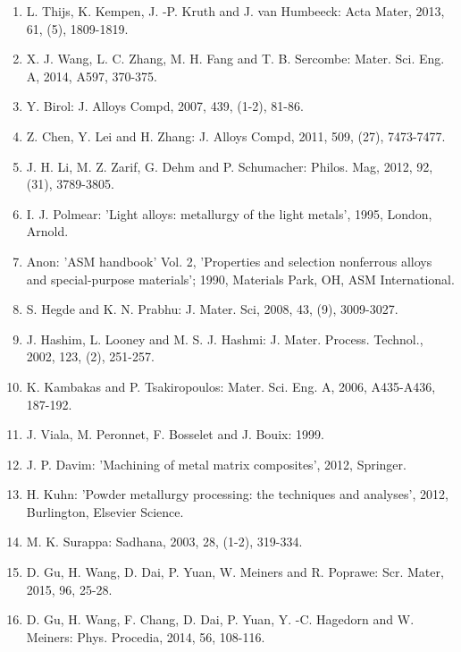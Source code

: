 \documentclass[10pt]{article}
\begin{document}
\begin{enumerate}
  \item L. Thijs, K. Kempen, J. -P. Kruth and J. van Humbeeck: Acta Mater, 2013, 61, (5), 1809-1819.

  \item X. J. Wang, L. C. Zhang, M. H. Fang and T. B. Sercombe: Mater. Sci. Eng. A, 2014, A597, 370-375.

  \item Y. Birol: J. Alloys Compd, 2007, 439, (1-2), 81-86.

  \item Z. Chen, Y. Lei and H. Zhang: J. Alloys Compd, 2011, 509, (27), 7473-7477.

  \item J. H. Li, M. Z. Zarif, G. Dehm and P. Schumacher: Philos. Mag, 2012, 92, (31), 3789-3805.

  \item I. J. Polmear: 'Light alloys: metallurgy of the light metals', 1995, London, Arnold.

  \item Anon: 'ASM handbook' Vol. 2, 'Properties and selection nonferrous alloys and special-purpose materials'; 1990, Materials Park, OH, ASM International.

  \item S. Hegde and K. N. Prabhu: J. Mater. Sci, 2008, 43, (9), 3009-3027.

  \item J. Hashim, L. Looney and M. S. J. Hashmi: J. Mater. Process. Technol., 2002, 123, (2), 251-257.

  \item K. Kambakas and P. Tsakiropoulos: Mater. Sci. Eng. A, 2006, A435-A436, 187-192.

  \item J. Viala, M. Peronnet, F. Bosselet and J. Bouix: 1999.

  \item J. P. Davim: 'Machining of metal matrix composites', 2012, Springer.

  \item H. Kuhn: 'Powder metallurgy processing: the techniques and analyses', 2012, Burlington, Elsevier Science.

  \item M. K. Surappa: Sadhana, 2003, 28, (1-2), 319-334.

  \item D. Gu, H. Wang, D. Dai, P. Yuan, W. Meiners and R. Poprawe: Scr. Mater, 2015, 96, 25-28.

  \item D. Gu, H. Wang, F. Chang, D. Dai, P. Yuan, Y. -C. Hagedorn and W. Meiners: Phys. Procedia, 2014, 56, 108-116.


\end{enumerate}
\end{document}
